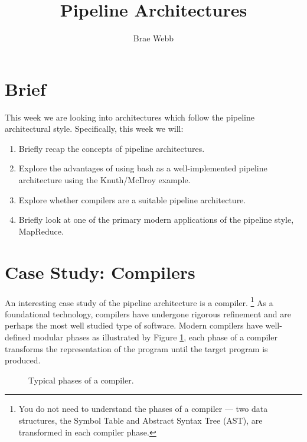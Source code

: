 \documentclass{csse4400}
\title{Pipeline Architectures}
\author{Brae Webb}
\date{\week{2}}
\begin{document}
\maketitle

\section{Brief}
This week we are looking into architectures which
follow the pipeline architectural style.
Specifically, this week we will:
\begin{enumerate}
    \item Briefly recap the concepts of pipeline architectures.
    \item Explore the advantages of using bash as a well-implemented pipeline architecture using the Knuth/McIlroy example.
    \item Explore whether compilers are a suitable pipeline architecture.
    \item Briefly look at one of the primary modern applications of the pipeline style,
        MapReduce.
\end{enumerate}

\section{Case Study: Compilers}

An interesting case study of the pipeline architecture is a compiler.%
\footnote{You do not need to understand the phases of a compiler --- two data structures, the Symbol Table and Abstract Syntax Tree (AST), are transformed in each compiler phase.}
As a foundational technology, compilers have undergone rigorous refinement and are perhaps the most well studied type of software.
Modern compilers have well-defined modular phases as illustrated by Figure \ref{fig:compiler-architecture},
each phase of a compiler transforms the representation of the program until the target program is produced.

\begin{figure}[H]
    \centering
{}
\caption{Typical phases of a compiler.}
\label{fig:compiler-architecture}
\end{figure}
\end{document}
